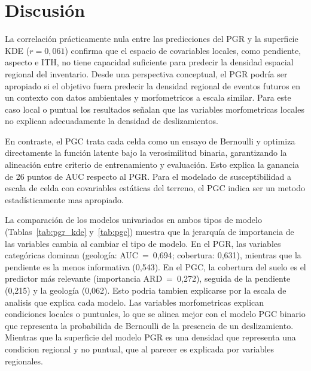 \documentclass[12pt, a4paper]{article}
\begin{document}
\section{Discusión}
\label{sec:discusion}

La correlación prácticamente nula entre las predicciones del PGR y la superficie KDE ($r = 0{,}061$) confirma que el espacio de
covariables locales, como pendiente, aspecto e ITH, no tiene capacidad suficiente para predecir la densidad espacial regional 
del inventario. Desde una perspectiva conceptual, el PGR podría ser apropiado si el objetivo fuera predecir la densidad regional 
de eventos futuros en un contexto con datos ambientales y morfometricos a escala similar. Para este caso local o puntual los resultados señalan 
que las variables morfometricas locales no explican adecuadamente la densidad de deslizamientos.

En contraste, el PGC trata cada celda como un ensayo de Bernoulli y optimiza directamente la función latente bajo la verosimilitud 
binaria, garantizando la alineación entre criterio de entrenamiento y evaluación. Esto explica la ganancia de 26 puntos de AUC
respecto al PGR. Para el modelado de susceptibilidad a escala de celda con covariables estáticas del terreno, el PGC indica ser un 
metodo estadísticamente mas apropiado.

La comparación de los modelos univariados en ambos tipos de modelo
(Tablas~\ref{tab:pgr_kde} y~\ref{tab:pgc}) muestra que la jerarquía de importancia de las variables cambia al cambiar el tipo de modelo.
En el PGR, las variables categóricas dominan (geología: AUC~=~0{,}694; cobertura: 0{,}631), mientras que la pendiente es la menos
informativa (0{,}543). En el PGC, la cobertura del suelo es el predictor más relevante (importancia ARD~=~0{,}272),
seguida de la pendiente (0{,}215) y la geología (0{,}062). Esto podria tambien explicarse por la escala de analisis que explica cada modelo.
Las variables morfometricas explican condiciones locales o puntuales, lo que se alinea mejor con el modelo PGC binario que representa
la probabilida de Bernoulli de la presencia de un deslizamiento. Mientras que la superficie del modelo PGR es una densidad que representa 
una condicion regional y no puntual, que al parecer es explicada por variables regionales.
\end{document}
